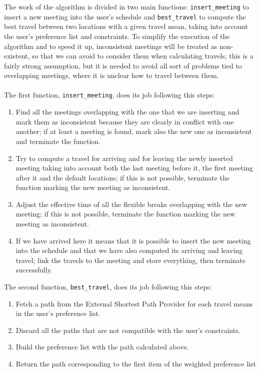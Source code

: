 The work of the algorithm is divided in two main functions: \texttt{insert\_meeting} to insert a new meeting into the user's schedule and \texttt{best\_travel} to compute the best travel between two locations with a given travel mean, taking into account the user's preference list and constraints. To simplify the execution of the algorithm and to speed it up, inconsistent meetings will be treated as non-existent, so that we can avoid to consider them when calculating travels; this is a fairly strong assumption, but it is needed to avoid all sort of problems tied to overlapping meetings, where it is unclear how to travel between them. \\
\\
The first function, \texttt{insert\_meeting}, does its job following this steps:
\begin{enumerate}
\item Find all the meetings overlapping with the one that we are inserting and mark them as inconsistent because they are clearly in conflict with one another; if at least a meeting is found, mark also the new one as inconsistent and terminate the function.
\item Try to compute a travel for arriving and for leaving the newly inserted meeting taking into account both the last meeting before it, the first meeting after it and the default locations; if this is not possible, terminate the function marking the new meeting as inconsistent.
\item Adjust the effective time of all the flexible breaks overlapping with the new meeting; if this is not possible, terminate the function marking the new meeting as inconsistent.
\item If we have arrived here it means that it is possible to insert the new meeting into the schedule and that we have also computed its arriving and leaving travel; link the travels to the meeting and store everything, then terminate successfully.
\end{enumerate}

The second function, \texttt{best\_travel}, does its job following this steps:
\begin{enumerate}
\item Fetch a path from the External Shortest Path Provider for each travel means in the user's preference list.
\item Discard all the paths that are not compatible with the user's constraints.
\item Build the preference list with the path calculated above.
\item Return the path corresponding to the first item of the weighted preference list
\end{enumerate}